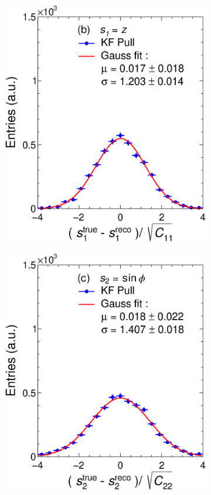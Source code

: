 \begin{figure}[t]
\begin{subfigure}{0.32\textwidth}
         \includegraphics[width=\textwidth]{figures/ch4-KF_NDGArLite/Toy/NoCorr/UnitKFEnd_p1.eps}
         \caption{}
         \label{fig:resp1KF_GArLite_NoCorr}
     \end{subfigure}
    \begin{subfigure}{0.32\textwidth}
         \centering
         \includegraphics[width=\textwidth]{figures/ch4-KF_NDGArLite/Toy/NoCorr/UnitKFEnd_p2.eps}

\end{subfigure}
\end{figure}
